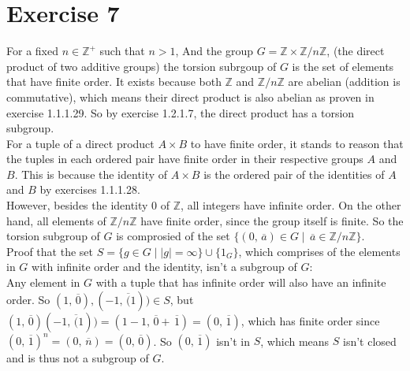 \documentclass{article}
\newcommand{\Z}{\mathbb{Z}}
\newcommand{\olsi}[1]{\,\overline{\!{#1}}}
\begin{document}
    \section*{Exercise 7}
    For a fixed $n \in \Z^+$ such that $n > 1$,
    And the group $G = \Z \times \Z/n\Z$,
    (the direct product of two additive groups)
    the torsion subrgoup of $G$ is the set of elements that have finite
    order.
    It exists because both $\Z$ and $\Z/n\Z$ are abelian
    (addition is commutative),
    which means their direct product is also abelian
    as proven in exercise 1.1.1.29.
    So by exercise 1.2.1.7, the direct product has a torsion subgroup. \\
    For a tuple of a direct product $A \times B$ to have finite order,
    it stands to reason that the tuples in each ordered pair have finite
    order in their respective groups $A$ and $B$.
    This is because the identity of $A \times B$ is the ordered
    pair of the identities of $A$ and $B$ by exercises 1.1.1.28. \\
    However, besides the identity 0 of $\Z$, all integers have infinite
    order.
    On the other hand, all elements of $\Z/n\Z$ have finite order,
    since the group itself is finite.
    So the torsion subgroup of $G$ is comprosied of the set
    $\{(0, \olsi{a}) \in G \mid \olsi{a} \in \Z/n\Z \}$. \\
    Proof that the set $S = \{g \in G \mid |g| = \infty\} \cup \{1_G\}$,
    which comprises of the elements in $G$ with infinite order 
    and the identity, isn't a subgroup of $G$: \\
    Any element in $G$ with a tuple that has infinite order
    will also have an infinite order.
    So $(1, \olsi{0}), (-1, \olsi(1)) \in S$,
    but $(1, \olsi{0})(-1, \olsi(1)) = (1 - 1, \olsi{0} + \olsi{1})
    = (0, \olsi{1})$,
    which has finite order
    since $(0, \olsi{1})^n = (0, \olsi{n}) = (0, \olsi{0})$.
    So $(0, \olsi{1})$ isn't in $S$,
    which means $S$ isn't closed
    and is thus not a subgroup of $G$.
\end{document}
